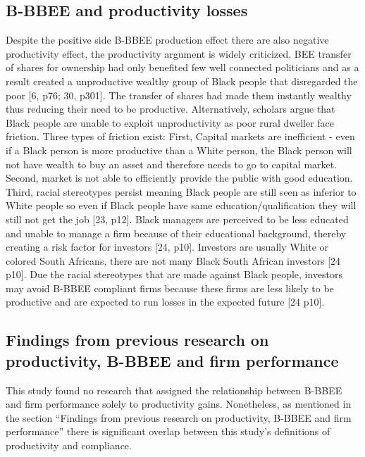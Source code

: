 \subsection{B-BBEE and productivity losses}
Despite the positive side B-BBEE production effect there are also negative productivity effect, the productivity argument is widely criticized. BEE transfer of shares for ownership had only benefited few well connected politicians and as a result created a unproductive wealthy group of Black people that disregarded the poor [6, p76; 30, p301]. The transfer of shares had made them instantly wealthy thus reducing their need to be productive. Alternatively, scholars argue that Black people are unable to exploit unproductivity as poor rural dweller face friction. Three types of friction exist: First, Capital markets are inefficient - even if a Black person is more productive than a White person, the Black person will not have wealth to buy an asset and therefore needs to go to capital market. Second, market is not able to efficiently provide the public with good education. Third, racial stereotypes persist meaning Black people are still seen as inferior to White people so even if Black people have same education/qualification they will still not get the job [23, p12]. Black managers are perceived to be less educated and unable to manage a firm because of their educational background, thereby creating a risk factor for investors [24, p10]. Investors are usually White or colored South Africans, there are not many Black South African investors [24 p10]. Due the racial stereotypes that are made against Black people, investors may avoid B-BBEE compliant firms because these firms are less likely to be productive and are expected to run losses in the expected future [24 p10].
\subsection{Findings from previous research on productivity, B-BBEE and firm performance}
This study found no research that assigned the relationship between B-BBEE and firm performance solely to productivity gains. Nonetheless, as mentioned in the section “Findings from previous research on productivity, B-BBEE and firm performance” there is significant overlap between this study’s definitions of productivity and compliance.
